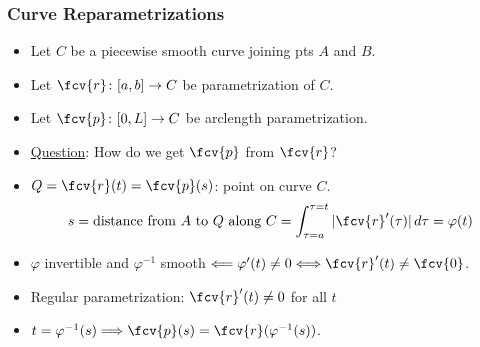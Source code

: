 \begin{frame}
\frametitle{Curve Reparametrizations}
\begin{itemize}
\item Let $C$ be a piecewise smooth curve joining pts $A$ and $B$.
\item Let $\fcv{r} \colon [a,b] \to C$ be parametrization of $C$.
\item Let $\fcv{p} \colon [0,L] \to C$ be arclength parametrization.
\item<2-> \underline{Question}: How do we get $\fcv{p}$ from $\fcv{r}$?
\item<3-> $Q = \fcv{r}(t) = \fcv{p}(s)$: point on curve $C$.
\[
s = \text{distance from } A \text{ to } Q \text{ along } C = \int_{\tau=a}^{\tau=t} |\fcv{r}'(\tau)| \, d\tau = \varphi(t)
\]
\item<4-> $\varphi$ invertible and $\varphi^{-1}$ smooth $\Longleftarrow \varphi'(t) \neq 0 \Longleftrightarrow \fcv{r}'(t)\neq \fcv{0}$.
\item<5-> Regular parametrization: $\fcv{r}'(t) \neq 0$ for all $t$
\item<6-> $t=\varphi^{-1}(s) \Longrightarrow \fcv{p}(s) = \fcv{r}(\varphi^{-1}(s))$.
\end{itemize}
\end{frame}